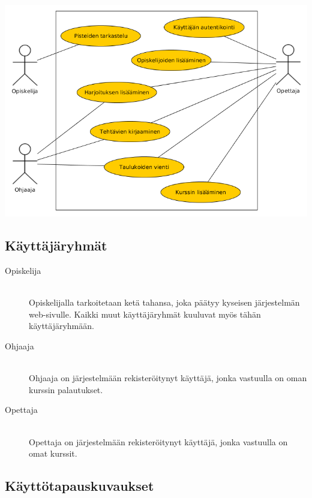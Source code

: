 \documentclass[a4paper,12pt, titlepage]{article}
\begin{document}
\includegraphics[scale=0.5]{kayttotapauskaavio}

\subsection{Käyttäjäryhmät}

\begin{description}
	\item[Opiskelija] \hfill \\
	Opiskelijalla tarkoitetaan ketä tahansa, joka päätyy kyseisen
	järjestelmän web-sivulle. Kaikki muut käyttäjäryhmät kuuluvat
	myös tähän käyttäjäryhmään.
	\item[Ohjaaja] \hfill \\
	Ohjaaja on järjestelmään rekisteröitynyt käyttäjä, jonka vastuulla
	on oman kurssin palautukset.
	\item[Opettaja] \hfill \\
	Opettaja on järjestelmään rekisteröitynyt käyttäjä, jonka
	vastuulla on omat kurssit.
\end{description}

\subsection{Käyttötapauskuvaukset}
\end{document}

